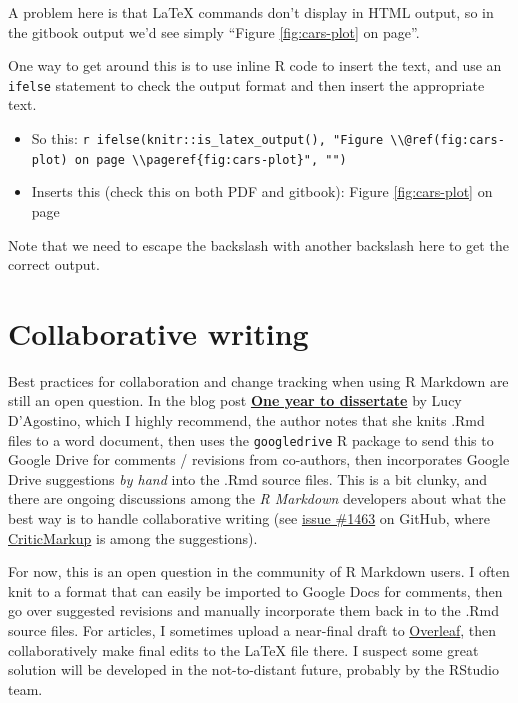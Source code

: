 \documentclass[a4paper, nobind]{templates/ociamthesis}
\providecommand{\tightlist}{%
  \setlength{\itemsep}{0pt}\setlength{\parskip}{0pt}}
\begin{document}
A problem here is that LaTeX commands don't display in HTML output, so in the gitbook output we'd see simply ``Figure \ref{fig:cars-plot} on page''.

One way to get around this is to use inline R code to insert the text, and use an \texttt{ifelse} statement to check the output format and then insert the appropriate text.

\begin{itemize}
\tightlist
\item
  So this: \texttt{\textasciigrave{}r\ ifelse(knitr::is\_latex\_output(),\ "Figure\ \textbackslash{}\textbackslash{}@ref(fig:cars-plot)\ on\ page\ \textbackslash{}\textbackslash{}pageref\{fig:cars-plot\}",\ "")\textasciigrave{}}
\item
  Inserts this (check this on both PDF and gitbook): Figure \ref{fig:cars-plot} on page \pageref{fig:cars-plot}
\end{itemize}

Note that we need to escape the backslash with another backslash here to get the correct output.

\hypertarget{collaborative-writing}{%
\section{Collaborative writing}\label{collaborative-writing}}

Best practices for collaboration and change tracking when using R Markdown are still an open question.
In the blog post \href{https://livefreeordichotomize.com/2018/09/14/one-year-to-dissertate/}{\textbf{One year to dissertate}} by Lucy D'Agostino, which I highly recommend, the author notes that she knits .Rmd files to a word document, then uses the \texttt{googledrive} R package to send this to Google Drive for comments / revisions from co-authors, then incorporates Google Drive suggestions \emph{by hand} into the .Rmd source files.
This is a bit clunky, and there are ongoing discussions among the \emph{R Markdown} developers about what the best way is to handle collaborative writing (see \href{https://github.com/rstudio/rmarkdown/issues/1463}{issue \#1463} on GitHub, where \href{http://criticmarkup.com}{CriticMarkup} is among the suggestions).

For now, this is an open question in the community of R Markdown users.
I often knit to a format that can easily be imported to Google Docs for comments, then go over suggested revisions and manually incorporate them back in to the .Rmd source files.
For articles, I sometimes upload a near-final draft to \href{https://www.overleaf.com/}{Overleaf}, then collaboratively make final edits to the LaTeX file there.
I suspect some great solution will be developed in the not-to-distant future, probably by the RStudio team.
\end{document}

